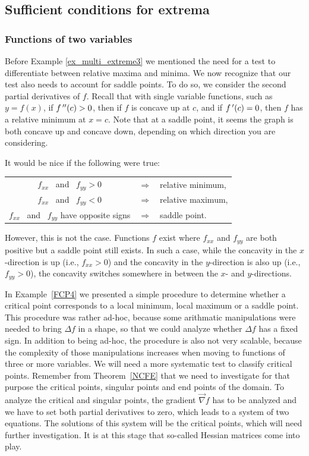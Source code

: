 \subsection{Sufficient conditions for extrema}
\label{FMV}

\subsubsection{Functions of two variables}


Before Example \ref{ex_multi_extreme3} we mentioned the need for a test to differentiate between relative maxima and minima. We now recognize that our test also needs to account for saddle points. To do so, we consider the second partial derivatives of $f$. Recall that with single variable functions, such as $y=f(x)$, if $f\,''(c)>0$, then if $f$ is concave up at $c$, and if $f\,'(c) =0$, then $f$ has a relative minimum at $x=c$.  Note that at a saddle point, it seems the graph is both concave up and concave down, depending on which direction you are considering.

It would be nice if the following were true:
\begin{center}
	\begin{tabular}{ccl}
	$f_{xx}\,\,\,$ and $\,\,\,f_{yy} >0$ & $\Rightarrow$ & relative minimum,\\
	$f_{xx}\,\,\,$ and $\,\,\,f_{yy} <0$ & $\Rightarrow$ & relative maximum,\\
	$f_{xx}\,\,\,$ and $\,\,\,f_{yy}$ have opposite signs & $\Rightarrow$ & saddle point.
	\end{tabular}
\end{center}

However, this is not the case. Functions $f$ exist where $f_{xx}$ and $f_{yy}$ are both positive  but a saddle point still exists. In such a case, while the concavity in the $x$-direction is up (i.e., $f_{xx}>0$) and the concavity in the $y$-direction is also up (i.e., $f_{yy}>0$), the concavity switches somewhere in between the $x$- and $y$-directions.



In Example~\ref{FCP4} we presented a simple procedure to determine whether a critical point corresponds to a local minimum, local maximum or a saddle point. This procedure was rather ad-hoc, because some arithmatic manipulations were needed to bring $\Delta f$ in a shape, so that we could analyze whether $\Delta f$ has a fixed sign. In addition to being ad-hoc, the procedure is also not very scalable, because the complexity of those manipulations increases when moving to functions of three \ifanalysis or more \fi variables. We will need a more systematic test to classify critical points. Remember from Theorem~\ref{NCFE} that we need to investigate for that purpose the critical points, singular points and end points of the domain. To analyze the critical and singular points, the gradient  $\vec{\nabla} f$ has to be analyzed and we have to set both partial derivatives to zero, which leads to a system of two equations. The solutions of this system will be the critical points, which will need further investigation. It is at this stage that so-called Hessian matrices come into play.

